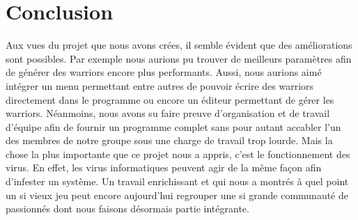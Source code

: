 \documentclass[a4paper,12pt]{article}
\begin{document}
\section{Conclusion}
Aux vues du projet que nous avons crées, il semble évident que des améliorations sont possibles. Par exemple nous aurions pu trouver de meilleurs paramètres afin de générer des warriors encore plus performants. Aussi, nous aurions aimé intégrer un menu permettant entre autres de pouvoir écrire des warriors directement dans le programme ou encore un éditeur permettant de gérer les warriors. Néanmoins, nous avons su faire preuve d'organisation et de travail d'équipe afin de fournir un programme complet sans pour autant accabler l'un des membres de notre groupe sous une charge de travail trop lourde. Mais la chose la plus importante que ce projet nous a appris, c'est le fonctionnement des virus. En effet, les virus informatiques peuvent agir de la même façon afin d'infester un système. Un travail enrichissant et qui nous a montrés à quel point un si vieux jeu peut encore aujourd'hui regrouper une si grande communauté de passionnés dont nous faisons désormais partie intégrante.
\pagebreak
\end{document}
